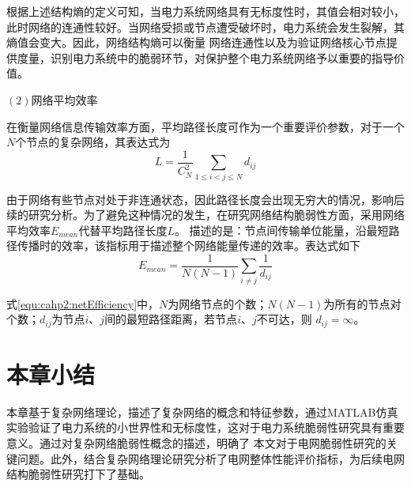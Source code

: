 根据上述结构熵的定义可知，当电力系统网络具有无标度性时，其值会相对较小，此时网络的连通性较好。当网络受损或节点遭受破坏时，电力系统会发生裂解，其熵值会变大。因此，网络结构熵可以衡量
网络连通性以及为验证网络核心节点提供度量，识别电力系统中的脆弱环节，对保护整个电力系统网络予以重要的指导价值。

$(2)$网络平均效率

在衡量网络信息传输效率方面，平均路径长度可作为一个重要评价参数，对于一个$N$个节点的复杂网络，其表达式为
\begin{equation}
  L=\frac{1}{C_{N}^{2}} \sum_{1 \leq i<j \leq N} d_{i j}
\end{equation}

由于网络有些节点对处于非连通状态，因此路径长度会出现无穷大的情况，影响后续的研究分析。为了避免这种情况的发生，在研究网络结构脆弱性方面，采用网络平均效率$E_{mean}$代替平均路径长度$L$。
描述的是：节点间传输单位能量，沿最短路径传播时的效率，该指标用于描述整个网络能量传递的效率。表达式如下
\begin{equation}
\label{equ:cahp2:netEfficiency}
  E_{mean}=\frac{1}{N(N-1)} \sum_{i \neq j} \frac{1}{d_{i j}}
\end{equation}

式\ref{equ:cahp2:netEfficiency}中，$N$为网络节点的个数；$N(N-1)$为所有的节点对个数；$d_{ij}$为节点$i$、$j$间的最短路径距离，若节点$i$、$j$不可达，则 $d_{i j}=\infty$。

\section{本章小结}
\label{sec:sum2}
本章基于复杂网络理论，描述了复杂网络的概念和特征参数，通过MATLAB仿真实验验证了电力系统的小世界性和无标度性，这对于电力系统脆弱性研究具有重要意义。通过对复杂网络脆弱性概念的描述，明确了
本文对于电网脆弱性研究的关键问题。此外，结合复杂网络理论研究分析了电网整体性能评价指标，为后续电网结构脆弱性研究打下了基础。




